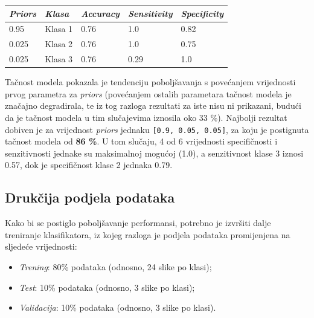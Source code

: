 \documentclass[12pt,a4paper]{article}
\begin{document}
\begin{table}[H]
\centering
\begin{tabular}{|l|l|l|l|l|}
\hline
\textbf{\textit{Priors}} 		& \textbf{\textit{Klasa}}   	& \textbf{\textit{Accuracy}} 		& \textbf{\textit{Sensitivity}} 			& \textbf{\textit{Specificity}} 		\\ \hline
0.95            					& Klasa 1 				& 0.76              					& 1.0                  					& 0.82                				\\ \hline
0.025           				& Klasa 2 				& 0.76              					& 1.0                  					& 0.75         						\\ \hline
0.025           				& Klasa 3 				& 0.76              					& 0.29                 					& 1.0           						\\ \hline
\end{tabular}
\end{table}

\newpage

Tačnost modela pokazala je tendenciju poboljšavanja s povećanjem vrijednosti prvog parametra za \textit{priors} (povećanjem ostalih parametara tačnost modela je značajno degradirala, te iz tog razloga rezultati za iste nisu ni prikazani, budući da je tačnost modela u tim slučajevima iznosila oko 33 \%). Najbolji rezultat dobiven je za vrijednost \textit{priors} jednaku \texttt{[0.9, 0.05, 0.05]}, za koju je postignuta tačnost modela od \textbf{86 \%}. U tom slučaju, 4 od 6 vrijednosti specifičnosti i senzitivnosti jednake su maksimalnoj mogućoj (1.0), a senzitivnost klase 3 iznosi 0.57, dok je specifičnost klase 2 jednaka 0.79.

\subsection{Drukčija podjela podataka}

Kako bi se postiglo poboljšavanje performansi, potrebno je izvršiti dalje treniranje klasifikatora, iz kojeg razloga je podjela podataka promijenjena na sljedeće vrijednosti:

\begin{itemize}

\item \textit{Trening}: 80\% podataka (odnosno, 24 slike po klasi);
\item \textit{Test}: 10\% podataka (odnosno, 3 slike po klasi);
\item \textit{Validacija}: 10\% podataka (odnosno, 3 slike po klasi).

\end{itemize}
\end{document}
